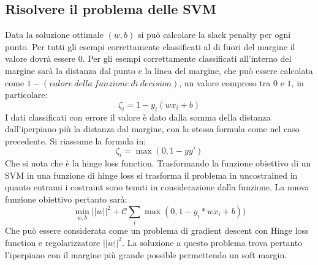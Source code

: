 	\subsection{Risolvere il problema delle SVM}
	Data la soluzione ottimale $(w,b)$ si pu\`o calcolare la slack penalty per ogni punto.
	Per tutti gli esempi correttamente classificati al di fuori del margine il valore dovr\`a essere $0$.
	Per gli esempi correttamente classificati all'interno del margine sar\`a la distanza dal punto e la linea del margine, che pu\`o essere calcolata come $1-(valore\ della\ funzione\ di\ decision)$, un valore compreso tra $0$ e $1$, in particolare:
	$$\zeta_i = 1 - y_i(wx_i+b)$$
	I dati classificati con errore il valore \`e dato dalla somma della distanza dall'iperpiano pi\`u la distanza dal margine, con la stessa formula come nel caso precedente.
	Si riassume la formula in:
	$$\zeta_i = \max(0,1-yy')$$
	Che si nota che \`e la hinge loss function.
	Trasformando la funzione obiettivo di un SVM in una funzione di hinge loss si trasforma il problema in uncostrained in quanto entrami i costraint sono tenuti in considerazione dalla funzione.
	La nuova funzione obiettivo pertanto sar\`a:
	$$\min_{w,b}||w||^2+\mathcal{C}\sum_i\max(0,1-y_i*wx_i+b))$$
	Che pu\`o essere considerata come un problema di gradient descent con Hinge loss function e regolarizzatore $||w||^2$.
	La soluzione a questo problema trova pertanto l'iperpiano con il margine pi\`u grande possible permettendo un soft margin.

